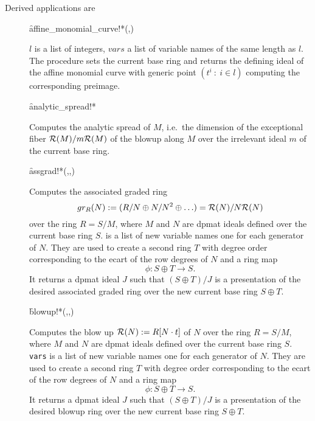 Derived applications are
\begin{description}

\item[]
  \begin{syntax}
    \f{affine\_monomial\_curve!*}(,)
  \end{syntax}
  \hypertarget{procedure:AFFINE_MONOMIAL_CURVE!*}{}
$l$ is a list of integers, $vars$ a list of variable names of the
same length as $l$. The procedure sets the current base ring and
returns the defining ideal of the affine monomial curve with generic
point $(t^i\ :\ i\in l)$ computing the corresponding preimage.


\item[]
  \begin{syntax}
    \f{analytic\_spread!*} 
  \end{syntax}
  \hypertarget{procedure:ANALYTIC_SPREAD!*}{}
Computes the analytic spread of $M$, i.e.\ the dimension of the
exceptional fiber ${\cal R}(M)/m{\cal R}(M)$ of the blowup along $M$
over the irrelevant ideal $m$ of the current base ring.

\item[]
  \begin{syntax}
    \f{assgrad!*}(,,)
  \end{syntax}
  \hypertarget{procedure:ASSGRAD!*}{}
Computes the associated graded ring \[gr_R(N):=
(R/N\oplus N/N^2\oplus\ldots)={\cal R}(N)/N{\cal R}(N)\] over the ring
$R=S/M$, where $M$ and
$N$ are dpmat ideals defined over the current base ring $S$. 
is a list of new variable names one for each generator of $N$.
They are used to create a second ring $T$ with degree order
corresponding to the ecart of the row degrees of $N$ and a ring map
\[\phi : S\oplus T\longrightarrow S.\]
It returns a dpmat ideal $J$ such that $(S\oplus T)/J$ is  a
presentation of the
desired associated graded ring over the new current base ring
$S\oplus T$.

\item[]
  \begin{syntax}
    \f{blowup!*}(,,)
  \end{syntax}
  \hypertarget{procedure:BLOWUP!*}{}
Computes the blow up ${\cal R}(N):=R[N\cdot t]$ of $N$ over
the ring $R=S/M$, where $M$ and $N$ are dpmat ideals defined over the
current base ring $S$. \texttt{vars} is a list of new variable names one
for each generator of $N$. They are used to create a second ring $T$
with degree order corresponding to the ecart of the row degrees of
$N$ and a ring map
\[\phi : S\oplus T\longrightarrow S.\]
It returns a dpmat ideal $J$ such that $(S\oplus T)/J$ is
a presentation of the
desired blowup ring over the new current base ring $S\oplus T$.


\end{description}
